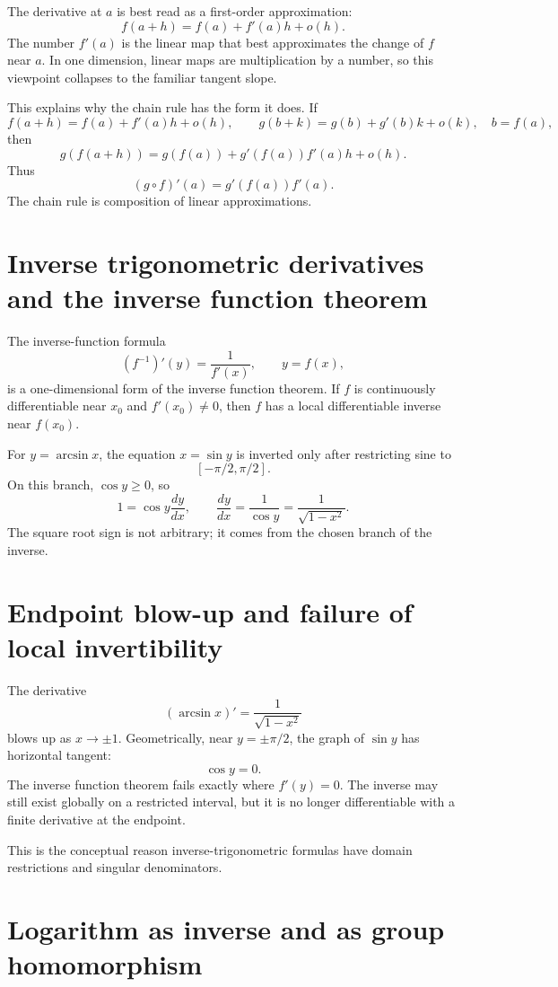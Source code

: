 The derivative at \(a\) is best read as a first-order approximation:
\[
  f(a+h)=f(a)+f'(a)h+o(h).
\]
The number \(f'(a)\) is the linear map that best approximates the change of \(f\) near \(a\).  In one dimension, linear maps are multiplication by a number, so this viewpoint collapses to the familiar tangent slope.

This explains why the chain rule has the form it does.  If
\[
  f(a+h)=f(a)+f'(a)h+o(h),\qquad
  g(b+k)=g(b)+g'(b)k+o(k),\quad b=f(a),
\]
then
\[
  g(f(a+h))=g(f(a))+g'(f(a))f'(a)h+o(h).
\]
Thus
\[
  (g\circ f)'(a)=g'(f(a))f'(a).
\]
The chain rule is composition of linear approximations.

\section{Inverse trigonometric derivatives and the inverse function theorem}

The inverse-function formula
\[
  (f^{-1})'(y)=\frac{1}{f'(x)},\qquad y=f(x),
\]
is a one-dimensional form of the inverse function theorem.  If \(f\) is continuously differentiable near \(x_0\) and \(f'(x_0)\ne0\), then \(f\) has a local differentiable inverse near \(f(x_0)\).

For \(y=\arcsin x\), the equation \(x=\sin y\) is inverted only after restricting sine to
\[
  [-\pi/2,\pi/2].
\]
On this branch, \(\cos y\ge0\), so
\[
  1=\cos y\frac{dy}{dx},\qquad
  \frac{dy}{dx}=\frac{1}{\cos y}=\frac{1}{\sqrt{1-x^2}}.
\]
The square root sign is not arbitrary; it comes from the chosen branch of the inverse.

\section{Endpoint blow-up and failure of local invertibility}

The derivative
\[
  (\arcsin x)'=\frac{1}{\sqrt{1-x^2}}
\]
blows up as \(x\to\pm1\).  Geometrically, near \(y=\pm\pi/2\), the graph of \(\sin y\) has horizontal tangent:
\[
  \cos y=0.
\]
The inverse function theorem fails exactly where \(f'(y)=0\).  The inverse may still exist globally on a restricted interval, but it is no longer differentiable with a finite derivative at the endpoint.

This is the conceptual reason inverse-trigonometric formulas have domain restrictions and singular denominators.

\section{Logarithm as inverse and as group homomorphism}


